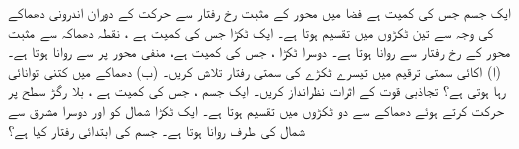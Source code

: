 ایک جسم جس کی  کمیت  ہے فضا میں  محور کے مثبت رخ  رفتار سے حرکت   کے دوران اندرونی دھماکے کی وجہ سے تین ٹکڑوں میں تقسیم ہوتا  ہے۔ ایک ٹکڑا جس کی کمیت  ہے  ، نقطہ دھماکہ سے مثبت     محور کے رخ    رفتار سے روانا ہوتا ہے۔ دوسرا ٹکڑا ، جس کی کمیت  ہے، منفی  محور پر  سے روانا  ہوتا  ہے۔ (ا) اکائی سمتی ترقیم میں  تیسرے ٹکڑے کی سمتی رفتار تلاش کریں۔ (ب)  دھماکے میں کتنی توانائی رہا ہوتی ہے؟ تجاذبی قوت کے  اثرات نظرانداز کریں۔
ایک  جسم ، جس کی کمیت  ہے ، بلا رگڑ سطح پر  حرکت کرتے ہوئے دھماکے سے دو  ٹکڑوں میں تقسیم ہوتا ہے۔ ایک ٹکڑا   شمال  کو اور دوسرا  مشرق سے  شمال  کی طرف روانا ہوتا ہے۔ جسم کی ابتدائی رفتار کیا ہے؟

